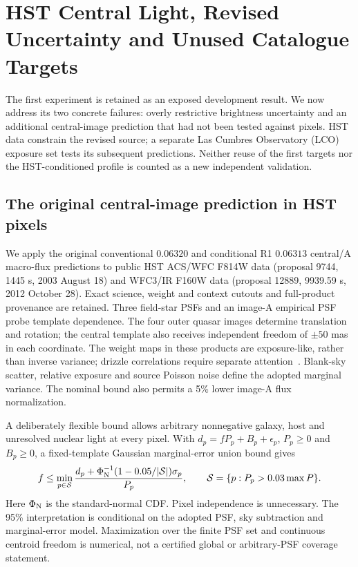 \section{HST Central Light, Revised Uncertainty and Unused Catalogue Targets}
\label{sec:observed-revision}
The first experiment is retained as an exposed development result.
We now address its two concrete failures: overly restrictive brightness
uncertainty and an additional central-image prediction that had not been
tested against pixels. HST data constrain the revised source; a separate
Las Cumbres Observatory (LCO) exposure set tests its subsequent predictions.
Neither reuse of the first targets nor the HST-conditioned profile is
counted as a new independent validation.

\subsection{The original central-image prediction in HST pixels}
We apply the original conventional $0.06320$ and conditional R1 $0.06313$
central/A macro-flux predictions to public
HST ACS/WFC F814W data (proposal 9744, 1445 s, 2003 August 18) and WFC3/IR
F160W data (proposal 12889, 9939.59 s, 2012 October 28). Exact science,
weight and context cutouts and full-product provenance are retained.
Three field-star PSFs and an image-A empirical PSF probe template
dependence. The four outer quasar images determine translation and
rotation; the central template also receives independent freedom of
$\pm50$ mas in each coordinate. The weight maps in these products are
exposure-like, rather than inverse variance; drizzle correlations require
separate attention~\cite{STScIDrizzle}. Blank-sky scatter, relative exposure and
source Poisson noise define the adopted marginal variance.
The nominal bound also permits a 5\% lower image-A flux normalization.

A deliberately flexible bound allows arbitrary nonnegative galaxy,
host and unresolved nuclear light at every pixel. With
$d_p=fP_p+B_p+\epsilon_p$, $P_p\geq0$ and $B_p\geq0$, a fixed-template
Gaussian marginal-error union bound gives
\begin{equation}
 f\leq\min_{p\in\mathcal S}
 \frac{d_p+\Phi_{\rm N}^{-1}(1-0.05/|\mathcal S|)\sigma_p}{P_p},
 \qquad \mathcal S=\{p:P_p>0.03\max P\}.
 \label{eq:hst-positive-bound}
\end{equation}
Here $\Phi_{\rm N}$ is the standard-normal CDF. Pixel independence is
unnecessary. The 95\% interpretation is conditional on the adopted PSF,
sky subtraction and marginal-error model. Maximization over the finite
PSF set and continuous centroid freedom is numerical, not a certified
global or arbitrary-PSF coverage statement.

